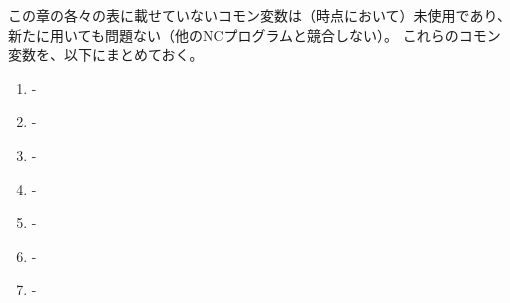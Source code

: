\clearpage
この章の各々の表に載せていないコモン変数は（\dateUnusedVariables 時点において）未使用であり、新たに用いても問題ない（他のNCプログラムと競合しない）。
これらのコモン変数を、以下にまとめておく。
\begin{enumerate}[label=\sarrow]
\item {}-
\item {}-
\item {}-
\item {}-
\item {}-
\item {}-
\item {}-
\end{enumerate}
